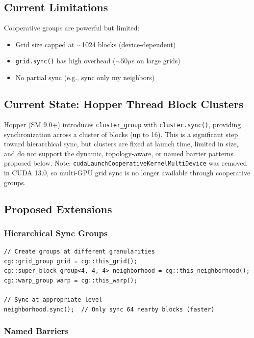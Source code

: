 \documentclass[11pt,a4paper]{article}
\begin{document}
\subsection{Current Limitations}

Cooperative groups are powerful but limited:
\begin{itemize}[leftmargin=*]
    \item Grid size capped at $\sim$1024 blocks (device-dependent)
    \item \texttt{grid.sync()} has high overhead ($\sim$50$\mu$s on large grids)
    \item No partial sync (e.g., sync only my neighbors)
\end{itemize}

\subsection{Current State: Hopper Thread Block Clusters}

Hopper (SM 9.0+) introduces \texttt{cluster\_group} with \texttt{cluster.sync()}, providing synchronization across a cluster of blocks (up to 16). This is a significant step toward hierarchical sync, but clusters are fixed at launch time, limited in size, and do not support the dynamic, topology-aware, or named barrier patterns proposed below. Note: \texttt{cudaLaunchCooperativeKernelMultiDevice} was removed in CUDA 13.0, so multi-GPU grid sync is no longer available through cooperative groups.

\subsection{Proposed Extensions}

\subsubsection{Hierarchical Sync Groups}

\begin{lstlisting}[style=cstyle]
// Create groups at different granularities
cg::grid_group grid = cg::this_grid();
cg::super_block_group<4, 4, 4> neighborhood = cg::this_neighborhood();
cg::warp_group warp = cg::this_warp();

// Sync at appropriate level
neighborhood.sync();  // Only sync 64 nearby blocks (faster)
\end{lstlisting}

\subsubsection{Named Barriers}
\end{document}
